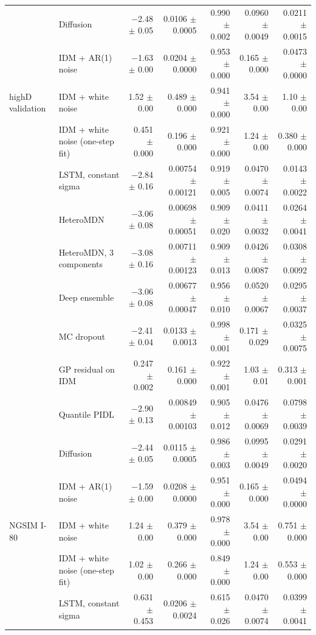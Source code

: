 \begin{longtable}{llrrrrr}
 & Diffusion & $-$2.48 $\pm$ 0.05 & 0.0106 $\pm$ 0.0005 & 0.990 $\pm$ 0.002 & 0.0960 $\pm$ 0.0049 & 0.0211 $\pm$ 0.0015 \\
 & IDM + AR(1) noise & $-$1.63 $\pm$ 0.00 & 0.0204 $\pm$ 0.0000 & 0.953 $\pm$ 0.000 & 0.165 $\pm$ 0.000 & 0.0473 $\pm$ 0.0000 \\
\midrule
highD validation & IDM + white noise & 1.52 $\pm$ 0.00 & 0.489 $\pm$ 0.000 & 0.941 $\pm$ 0.000 & 3.54 $\pm$ 0.00 & 1.10 $\pm$ 0.00 \\
 & IDM + white noise (one-step fit) & 0.451 $\pm$ 0.000 & 0.196 $\pm$ 0.000 & 0.921 $\pm$ 0.000 & 1.24 $\pm$ 0.00 & 0.380 $\pm$ 0.000 \\
 & LSTM, constant sigma & $-$2.84 $\pm$ 0.16 & 0.00754 $\pm$ 0.00121 & 0.919 $\pm$ 0.005 & 0.0470 $\pm$ 0.0074 & 0.0143 $\pm$ 0.0022 \\
 & HeteroMDN & $-$3.06 $\pm$ 0.08 & 0.00698 $\pm$ 0.00051 & 0.909 $\pm$ 0.020 & 0.0411 $\pm$ 0.0032 & 0.0264 $\pm$ 0.0041 \\
 & HeteroMDN, 3 components & $-$3.08 $\pm$ 0.16 & 0.00711 $\pm$ 0.00123 & 0.909 $\pm$ 0.013 & 0.0426 $\pm$ 0.0087 & 0.0308 $\pm$ 0.0092 \\
 & Deep ensemble & $-$3.06 $\pm$ 0.08 & 0.00677 $\pm$ 0.00047 & 0.956 $\pm$ 0.010 & 0.0520 $\pm$ 0.0067 & 0.0295 $\pm$ 0.0037 \\
 & MC dropout & $-$2.41 $\pm$ 0.04 & 0.0133 $\pm$ 0.0013 & 0.998 $\pm$ 0.001 & 0.171 $\pm$ 0.029 & 0.0325 $\pm$ 0.0075 \\
 & GP residual on IDM & 0.247 $\pm$ 0.002 & 0.161 $\pm$ 0.000 & 0.922 $\pm$ 0.001 & 1.03 $\pm$ 0.01 & 0.313 $\pm$ 0.001 \\
 & Quantile PIDL & $-$2.90 $\pm$ 0.13 & 0.00849 $\pm$ 0.00103 & 0.905 $\pm$ 0.012 & 0.0476 $\pm$ 0.0069 & 0.0798 $\pm$ 0.0039 \\
 & Diffusion & $-$2.44 $\pm$ 0.05 & 0.0115 $\pm$ 0.0005 & 0.986 $\pm$ 0.003 & 0.0995 $\pm$ 0.0049 & 0.0291 $\pm$ 0.0020 \\
 & IDM + AR(1) noise & $-$1.59 $\pm$ 0.00 & 0.0208 $\pm$ 0.0000 & 0.951 $\pm$ 0.000 & 0.165 $\pm$ 0.000 & 0.0494 $\pm$ 0.0000 \\
\midrule
NGSIM I-80 & IDM + white noise & 1.24 $\pm$ 0.00 & 0.379 $\pm$ 0.000 & 0.978 $\pm$ 0.000 & 3.54 $\pm$ 0.00 & 0.751 $\pm$ 0.000 \\
 & IDM + white noise (one-step fit) & 1.02 $\pm$ 0.00 & 0.266 $\pm$ 0.000 & 0.849 $\pm$ 0.000 & 1.24 $\pm$ 0.00 & 0.553 $\pm$ 0.000 \\
 & LSTM, constant sigma & 0.631 $\pm$ 0.453 & 0.0206 $\pm$ 0.0024 & 0.615 $\pm$ 0.026 & 0.0470 $\pm$ 0.0074 & 0.0399 $\pm$ 0.0041 \\

\end{longtable}
